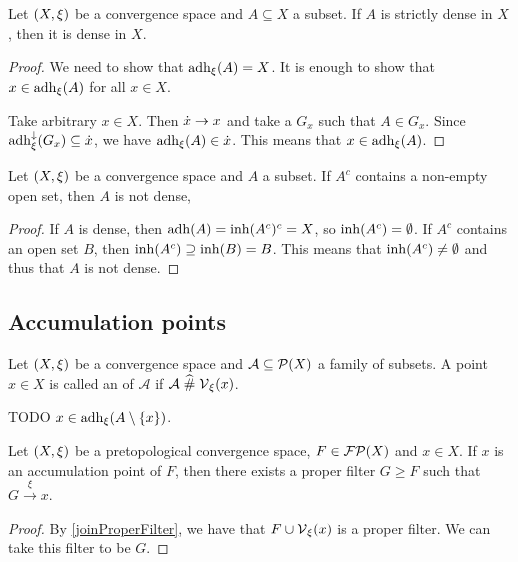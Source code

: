 \begin{lemma}
Let $\sSet{X,\xi}$ be a convergence space and $A\subseteq X$ a subset. If $A$ is strictly dense in $X$, then it is dense in $X$.
\end{lemma}
\begin{proof}
We need to show that $\operatorname{adh}_\xi(A) = X$. It is enough to show that $x\in \operatorname{adh}_\xi(A)$ for all $x\in X$.

Take arbitrary $x\in X$. Then $\dot{x}\to x$ and take a $G_x$ such that $A\in G_x$. Since $\operatorname{adh}_\xi^\downarrow(G_x)\subseteq \dot{x}$, we have $\operatorname{adh}_\xi(A) \in \dot{x}$. This means that $x\in \operatorname{adh}_\xi(A)$. 
\end{proof}

\begin{lemma} \label{openDensityLemma}
Let $\sSet{X, \xi}$ be a convergence space and $A$ a subset.
If $A^c$ contains a non-empty open set, then $A$ is not dense,
\end{lemma}
\begin{proof}
If $A$ is dense, then $\operatorname{adh}(A) = \operatorname{inh}(A^c)^c = X$, so $\operatorname{inh}(A^c) = \emptyset$. If $A^c$ contains an open set $B$, then $\operatorname{inh}(A^c) \supseteq \operatorname{inh}(B) = B$. This means that $\operatorname{inh}(A^c) \neq \emptyset$ and thus that $A$ is not dense.
\end{proof}

\subsection{Accumulation points}
\begin{definition}
Let $\sSet{X,\xi}$ be a convergence space and $\mathcal{A}\subseteq \operatorname{\mathcal{P}}(X)$ a family of subsets. A point $x\in X$ is called an  of $\mathcal{A}$ if $\mathcal{A}\mathrel{\widehat{\#}} \operatorname{\mathcal{V}}_\xi(x)$.
\end{definition}

TODO $x\in \operatorname{adh}_\xi(A\setminus\{x\})$.

\begin{proposition} \label{subfilterToAccumulationPoint}
Let $\sSet{X,\xi}$ be a pretopological convergence space, $F\in\operatorname{\mathcal{FP}}(X)$ and $x\in X$. If $x$ is an accumulation point of $F$, then there exists a proper filter $G \geq F$ such that $G\overset{\xi}{\longrightarrow} x$. 
\end{proposition}
\begin{proof}
By \ref{joinProperFilter}, we have that $F\cup \operatorname{\mathcal{V}}_\xi(x)$ is a proper filter. We can take this filter to be $G$.
\end{proof}


